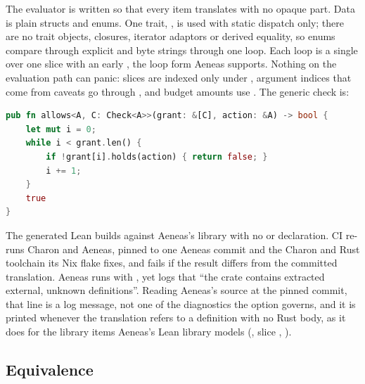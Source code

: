 The evaluator is written so that every item translates with no opaque part.
Data is plain structs and enums. One trait, , is used with
static dispatch only; there are no trait objects, closures, iterator adaptors
or derived equality, so enums compare through explicit  and byte
strings through one loop. Each loop is a single  over
one slice with an early , the loop form Aeneas supports. Nothing
on the evaluation path can panic: slices are indexed only under
, argument indices that come from caveats go through
, and budget amounts use . The generic check is:
\begin{lstlisting}[language=Rust]
pub fn allows<A, C: Check<A>>(grant: &[C], action: &A) -> bool {
    let mut i = 0;
    while i < grant.len() {
        if !grant[i].holds(action) { return false; }
        i += 1;
    }
    true
}
\end{lstlisting}
The generated Lean builds against Aeneas's library with no  or
 declaration. CI re-runs Charon and Aeneas, pinned to one Aeneas
commit and the Charon and Rust toolchain its Nix flake fixes, and fails if the
result differs from the committed translation. Aeneas
runs with , yet logs that ``the crate contains
extracted external, unknown definitions''. Reading Aeneas's source at the
pinned commit, that line is a log message, not one of the diagnostics the
option governs, and it is printed whenever the translation refers to a
definition with no Rust body, as it does for the library items Aeneas's Lean
library models (, slice , ).

\subsection{Equivalence}

